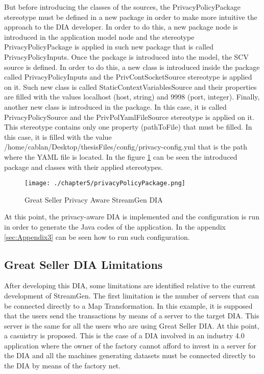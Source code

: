 But before introducing the classes of the sources, the PrivacyPolicyPackage stereotype must be defined in a new package in order to make more intuitive the approach to the DIA developer. In order to do this, a new package node is introduced in the application model node and the stereotype PrivacyPolicyPackage is applied in such new package that is called PrivacyPolicyInputs. Once the package is introduced into the model, the SCV source is defined. In order to do this, a new class is introduced inside the package called PrivacyPolicyInputs and the PrivContSocketSource stereotype is applied on it. Such new class is called StaticContextVariablesSource and their properties are filled with the values localhost (host, string) and 9998 (port, integer). Finally, another new class is introduced in the package. In this case, it is called PrivacyPolicySource and the PrivPolYamlFileSource stereotype is applied on it. This stereotype contains only one property (pathToFile) that must be filled. In this case, it is filled with the value /home/cablan/Desktop/thesisFiles/config/privacy-config.yml that is the path where the YAML file is located. In the figure \ref{fig:Great Seller Privacy Aware StreamGen DIA} can be seen the introduced package and classes with their applied stereotypes.

\begin{figure}
\centering
{\texttt{[image: ./chapter5/privacyPolicyPackage.png]}}
\caption{Great Seller Privacy Aware StreamGen DIA}
\label{fig:Great Seller Privacy Aware StreamGen DIA}
\end{figure}

At this point, the privacy-aware DIA is implemented and the configuration is run in order to generate the Java codes of the application. In the appendix \ref{sec:Appendix3} can be seen how to run such configuration.

\subsection{Great Seller DIA Limitations}

After developing this DIA, some limitations are identified relative to the current development of StreamGen. The first limitation is the number of servers that can be connected directly to a Map Transformation. In this example, it is supposed that the users send the transactions by means of a server to the target DIA. This server is the same for all the users who are using Great Seller DIA. At this point, a casuistry is proposed. This is the case of a DIA involved in an industry 4.0 application where the owner of the factory cannot afford to invest in a server for the DIA and all the machines generating datasets must be connected directly to the DIA by means of the factory net.

